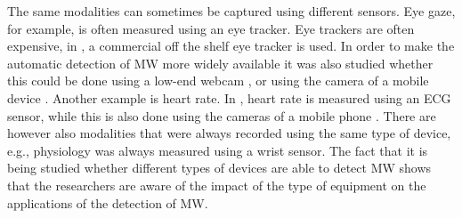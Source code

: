 The same modalities can sometimes be captured using different sensors. Eye gaze, for example, is often measured using an eye tracker. Eye trackers are often expensive, in \cite{Hutt2017OutClassroom}, a commercial off the shelf eye tracker is used. In order to make the automatic detection of MW more widely available it was also studied whether this could be done using a low-end webcam \cite{Stewart2017FaceComprehension}\cite{Stewart2016WheresViewing}\cite{Zhao2017ScalableApproach}, or using the camera of a mobile device \cite{ISI:000443429900018}. Another example is heart rate. In \cite{Gontier2016HowEnvironment}, heart rate is measured using an ECG sensor, while this is also done using the cameras of a mobile phone \cite{Pham2015Attentivelearner:Tracking}. There are however also modalities that were always recorded using the same type of device, e.g., physiology was always measured using a wrist sensor. The fact that it is being studied whether different types of devices are able to detect MW shows that the researchers are aware of the impact of the type of equipment on the applications of the detection of MW.